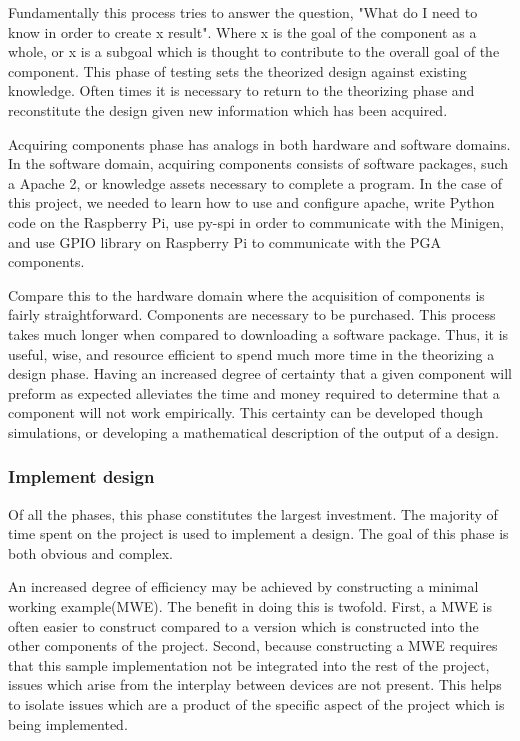 \documentclass{article}	%
\begin{document}
\begin{multicols}{2}
Fundamentally this process tries to answer the question,
"What do I need to know in order to create x result".
Where x is the goal of the component as a whole, or
x is a subgoal which is thought to contribute to 
the overall goal of the component.
This phase of testing
sets the theorized design against existing knowledge.
Often times it is necessary to return to the 
theorizing phase and reconstitute the design
given new information which has been acquired.

Acquiring components phase has analogs in both hardware and software domains.
In the software domain,
acquiring components consists of
software packages, such a Apache 2, or
knowledge assets necessary to complete a program.
In the case of this project,
we needed to learn how to use and configure apache,
write Python code on the Raspberry Pi,
use py-spi in order to communicate with the Minigen, and
use GPIO library on Raspberry Pi to communicate with the PGA components.

Compare this to the hardware domain where
the acquisition of components is fairly straightforward.
Components are necessary to be purchased.
This process takes much longer when compared
to downloading a software package.
Thus, it is useful, wise, and resource efficient to
spend much more time in the theorizing a design phase.
Having an increased degree of certainty that 
a given component will preform as expected
alleviates the time and money required to determine 
that a component will not work empirically.
This certainty can be developed though simulations, or
developing a mathematical description of the output of a design.

\subsubsection{Implement design}
Of all the phases, 
this phase constitutes the largest investment.
The majority of time spent on the project is
used to implement a design.
The goal of this phase is both obvious
and complex.

An increased degree of efficiency may be achieved by
constructing a minimal working example(MWE).
The benefit in doing this is twofold.
First, a MWE is often easier to construct compared to
a version which is constructed into the other
components of the project.
Second, because constructing a MWE requires that
this sample implementation not be integrated into
the rest of the project,
issues which arise from the interplay between devices are not present.
This helps to isolate issues which are a product
of the specific aspect of the project which is being implemented.


\end{multicols}
\end{document}
